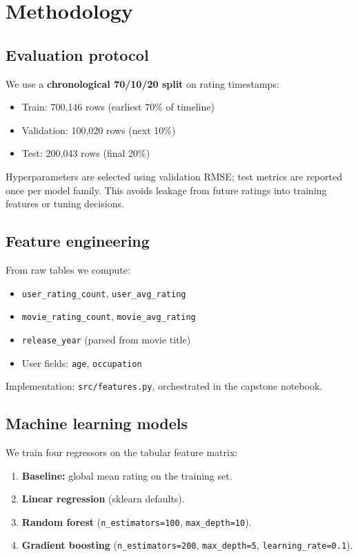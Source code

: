 \section{Methodology}

\subsection{Evaluation protocol}

We use a \textbf{chronological 70/10/20 split} on rating timestamps:
\begin{itemize}
  \item Train: 700{,}146 rows (earliest 70\% of timeline)
  \item Validation: 100{,}020 rows (next 10\%)
  \item Test: 200{,}043 rows (final 20\%)
\end{itemize}

Hyperparameters are selected using validation RMSE; test metrics are reported once per model family.
This avoids leakage from future ratings into training features or tuning decisions.

\subsection{Feature engineering}

From raw tables we compute:
\begin{itemize}
  \item \texttt{user\_rating\_count}, \texttt{user\_avg\_rating}
  \item \texttt{movie\_rating\_count}, \texttt{movie\_avg\_rating}
  \item \texttt{release\_year} (parsed from movie title)
  \item User fields: \texttt{age}, \texttt{occupation}
\end{itemize}

Implementation: \texttt{src/features.py}, orchestrated in the capstone notebook.

\subsection{Machine learning models}

We train four regressors on the tabular feature matrix:
\begin{enumerate}
  \item \textbf{Baseline:} global mean rating on the training set.
  \item \textbf{Linear regression} (sklearn defaults).
  \item \textbf{Random forest} (\texttt{n\_estimators=100}, \texttt{max\_depth=10}).
  \item \textbf{Gradient boosting} (\texttt{n\_estimators=200}, \texttt{max\_depth=5},
        \texttt{learning\_rate=0.1}).
\end{enumerate}

